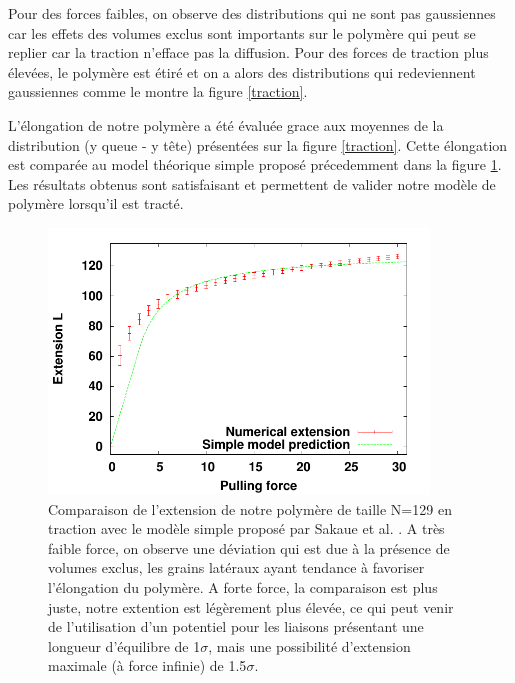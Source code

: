 \documentclass[a4paper,11pt]{article}
\begin{document}
Pour des forces faibles, on observe des distributions qui ne sont pas gaussiennes car les effets des volumes exclus sont importants sur le polymère qui peut se replier car la traction n'efface pas la diffusion. Pour des forces de traction plus élevées, le polymère est étiré et on a alors des distributions qui redeviennent gaussiennes comme le montre la figure \ref{traction}.


L'élongation de notre polymère a été évaluée grace aux moyennes de la distribution (y queue - y tête) présentées sur la figure \ref{traction}. Cette élongation est comparée au model théorique simple proposé précedemment dans la figure \ref{elongtraction}. Les résultats obtenus sont satisfaisant et permettent de valider notre modèle de polymère lorsqu'il est tracté.


\begin{figure}[H]
\begin{center}
\includegraphics[width=0.9\textwidth]{elongation.pdf}

\caption{Comparaison de l'extension de notre polymère de taille N=129 en traction avec le modèle simple proposé par Sakaue et al. \cite{Sakaue2012}. A très faible force, on observe une déviation qui est due à la présence de volumes exclus, les grains latéraux ayant tendance à favoriser l'élongation du polymère. A forte force, la comparaison est plus juste, notre extention est légèrement plus élevée, ce qui peut venir de l'utilisation d'un potentiel pour les liaisons présentant une longueur d'équilibre de 1$\sigma$, mais une possibilité d'extension maximale (à force infinie) de 1.5$\sigma$.}
\label{elongtraction}
\end{center}
\end{figure}






\end{document}
